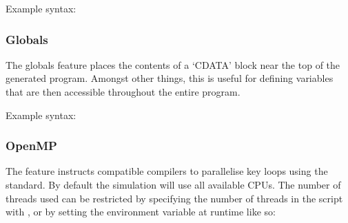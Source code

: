 \documentclass[letterpaper,10pt,english]{sphinxmanual}
\begin{document}
\sphinxAtStartPar
Example syntax:

\begin{sphinxVerbatim}[commandchars=\\\{\}]
   
\end{sphinxVerbatim}

\ignorespaces 

\subsubsection{Globals}
\label{\detokenize{reference_elements:globals}}\label{\detokenize{reference_elements:index-19}}\label{\detokenize{reference_elements:id4}}
\sphinxAtStartPar
The globals feature places the contents of a ‘CDATA’ block near the top of the generated program.  Amongst other things, this is useful for defining variables that are then accessible throughout the entire program.

\sphinxAtStartPar
Example syntax:

\begin{sphinxVerbatim}[commandchars=\\\{\}]
  \PYG{c+cp}{\PYGZlt{}![CDATA[}
        
       

       
  \PYG{c+cp}{]]\PYGZgt{}}
\end{sphinxVerbatim}

\ignorespaces 

\subsubsection{OpenMP}
\label{\detokenize{reference_elements:openmp}}\label{\detokenize{reference_elements:index-20}}\label{\detokenize{reference_elements:id5}}
\sphinxAtStartPar
The  feature instructs compatible compilers to parallelise key loops using the  standard.  By default the simulation will use all available CPUs.  The number of threads used can be restricted by specifying the number of threads in the script with , or by setting the  environment variable at run\sphinxhyphen{}time like so:
\end{document}

